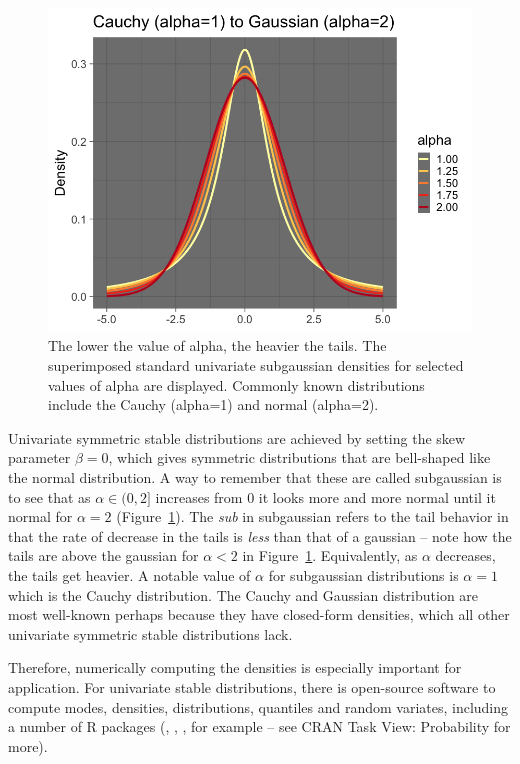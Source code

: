 \begin{figure}
  \center
  \includegraphics[scale=.4]{cauchy2gauss.png}
  \caption{The lower the value of alpha, the heavier the tails.
The superimposed standard univariate subgaussian densities for
selected values of alpha are displayed.  Commonly known distributions
include the Cauchy (alpha=1) and normal (alpha=2).}
  \label{fig:univariate}
\end{figure}

Univariate symmetric stable distributions are achieved by setting the
skew parameter $\beta=0$, which gives symmetric distributions that are
bell-shaped like the normal distribution.  A way to remember that
these are called subgaussian is to see that as $\alpha \in (0,2]$
increases from 0 it looks more and more normal until it 
normal for $\alpha=2$ (Figure~\ref{fig:univariate}).  The \emph{sub}
in subgaussian refers to the tail behavior in that the rate of
decrease in the tails is \emph{less} than that of a gaussian -- note
how the tails are above the gaussian for $\alpha<2$ in
Figure~\ref{fig:univariate}.  Equivalently, as $\alpha$ decreases, the
tails get heavier.  A notable value of $\alpha$ for subgaussian
distributions is $\alpha=1$ which is the Cauchy distribution.  The
Cauchy and Gaussian distribution are most well-known perhaps because
they have closed-form densities, which all other univariate symmetric
stable distributions lack.

Therefore, numerically computing the densities is especially important
for application.  For univariate stable distributions, there is
open-source software to compute modes, densities, distributions, quantiles
and random variates, including a number of R packages
(, , , for
example -- see CRAN Task View: Probability  for
more).


